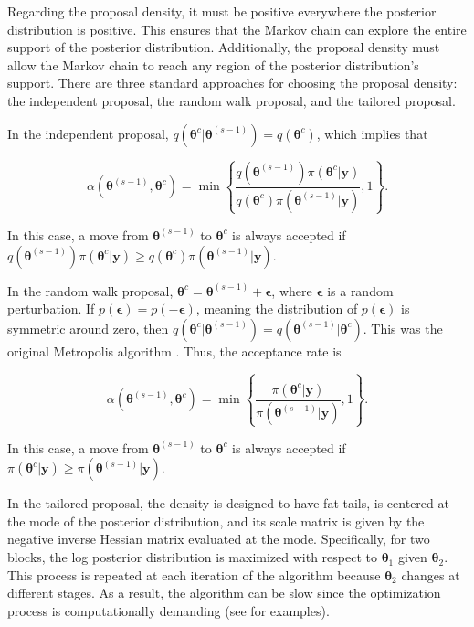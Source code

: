 Regarding the proposal density, it must be positive everywhere the posterior distribution is positive. This ensures that the Markov chain can explore the entire support of the posterior distribution. Additionally, the proposal density must allow the Markov chain to reach any region of the posterior distribution's support. There are three standard approaches for choosing the proposal density: the independent proposal, the random walk proposal, and the tailored proposal.

In the independent proposal, $q(\bm{\theta}^{c} | \bm{\theta}^{(s-1)}) = q(\bm{\theta}^{c})$, which implies that 

\[
\alpha(\bm{\theta}^{(s-1)}, \bm{\theta}^{c}) = 
\min\left\{\frac{q(\bm{\theta}^{(s-1)}) \pi(\bm{\theta}^{c} | \bm{y})}{q(\bm{\theta}^{c}) \pi(\bm{\theta}^{(s-1)} | \bm{y})}, 1\right\}.
\]

In this case, a move from $\bm{\theta}^{(s-1)}$ to $\bm{\theta}^{c}$ is always accepted if $q(\bm{\theta}^{(s-1)}) \pi(\bm{\theta}^{c} | \bm{y}) \geq q(\bm{\theta}^{c}) \pi(\bm{\theta}^{(s-1)} | \bm{y})$.

In the random walk proposal, $\bm{\theta}^{c} = \bm{\theta}^{(s-1)} + \bm{\epsilon}$, where $\bm{\epsilon}$ is a random perturbation. If $p(\bm{\epsilon}) = p(-\bm{\epsilon})$, meaning the distribution of $p(\bm{\epsilon})$ is symmetric around zero, then $q(\bm{\theta}^{c} | \bm{\theta}^{(s-1)}) = q(\bm{\theta}^{(s-1)} | \bm{\theta}^{c})$. This was the original Metropolis algorithm \cite{metropolis53}. Thus, the acceptance rate is 

\[
\alpha(\bm{\theta}^{(s-1)}, \bm{\theta}^{c}) = 
\min\left\{\frac{\pi(\bm{\theta}^{c} | \bm{y})}{\pi(\bm{\theta}^{(s-1)} | \bm{y})}, 1\right\}.
\]

In this case, a move from $\bm{\theta}^{(s-1)}$ to $\bm{\theta}^{c}$ is always accepted if $\pi(\bm{\theta}^{c} | \bm{y}) \geq \pi(\bm{\theta}^{(s-1)} | \bm{y})$.

In the tailored proposal, the density is designed to have fat tails, is centered at the mode of the posterior distribution, and its scale matrix is given by the negative inverse Hessian matrix evaluated at the mode. Specifically, for two blocks, the log posterior distribution is maximized with respect to $\bm{\theta}_1$ given $\bm{\theta}_2$. This process is repeated at each iteration of the algorithm because $\bm{\theta}_2$ changes at different stages. As a result, the algorithm can be slow since the optimization process is computationally demanding (see \cite[Chap.~7 and 9]{greenberg2012introduction} for examples).

